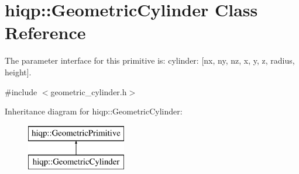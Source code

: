 \hypertarget{classhiqp_1_1GeometricCylinder}{\section{hiqp\-:\-:Geometric\-Cylinder Class Reference}
\label{classhiqp_1_1GeometricCylinder}
}


The parameter interface for this primitive is\-: cylinder\-: \mbox{[}nx, ny, nz, x, y, z, radius, height\mbox{]}.  




{\ttfamily \#include $<$geometric\-\_\-cylinder.\-h$>$}

Inheritance diagram for hiqp\-:\-:Geometric\-Cylinder\-:\begin{figure}[H]
\begin{center}
\leavevmode
\includegraphics[height=2.000000cm]{classhiqp_1_1GeometricCylinder}
\end{center}
\end{figure}
